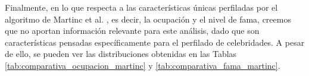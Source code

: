 \bigskip
\begin{table}[H]
	\centering
	\caption{Distribución media de los rasgos personales obtenidos por el algoritmo de Grivas et al. \cite{grivas2015author}}
	\label{tab:comparativa_rasgos_personales}
\end{table}

Finalmente, en lo que respecta a las características únicas perfiladas por el algoritmo de Martinc et al. \cite{martinc2019hot}, es decir, la ocupación y el nivel de fama,
creemos que no aportan información relevante para este análisis, dado que son características pensadas
específicamente para el perfilado de celebridades. A pesar de ello, se pueden ver las distribuciones obtenidas en las
Tablas \ref{tab:comparativa_ocupacion_martinc} y \ref{tab:comparativa_fama_martinc}.

